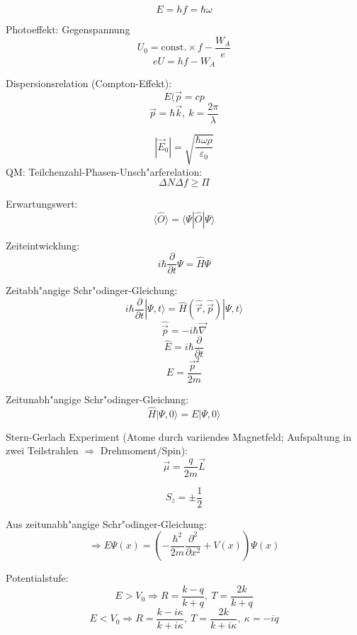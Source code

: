 \documentclass[12pt]{report}
\newcommand{\vabla}{\vec{\nabla}}
\newcommand{\vepsilon}{\varepsilon}
\begin{document}
\[E=hf=\hbar\omega\]

Photoeffekt:
Gegenspannung
\[U_0=\mathrm{const.}\times f-\frac{W_A}{e}\]
\[eU=hf-W_A\]

Dispersionsrelation (Compton-Effekt):
\[E(\vec{p}=cp\]
\[\vec{p}=\hbar\vec{k},\ k=\frac{2\pi}{\lambda}\]

\[|\vec{E}_0|=\sqrt{\frac{\hbar\omega\rho}{\vepsilon_0}}\]
QM: Teilchenzahl-Phasen-Unsch"arferelation:
\[\Delta N\Delta f\geq\Pi\]

Erwartungswert:
\[\langle\hat{O}\rangle=\langle\Psi|\hat{O}|\Psi\rangle\]

Zeiteintwicklung:
\[i\hbar\frac{\partial}{\partial t}\Psi=\hat{H}\Psi\]

Zeitabh"angige Schr"odinger-Gleichung:
\[i\hbar\frac{\partial}{\partial t}|\Psi,t\rangle=\hat{H}(\hat{\vec{r}},\hat{\vec{p}})|\Psi,t\rangle\]
\[\hat{\vec{p}}=-i\hbar\vabla\]
\[\hat{E}=i\hbar\frac{\partial}{\partial t}\]
\[E=\frac{\vec{p}^2}{2m}\]

Zeitunabh"angige Schr"odinger-Gleichung:
\[\hat{H}|\Psi,0\rangle=E|\Psi,0\rangle\]

Stern-Gerlach Experiment (Atome durch variiendes Magnetfeld; Aufspaltung in zwei Teilstrahlen $\Rightarrow$ Drehmoment/Spin):
\[\vec{\mu}=\frac{q}{2m}\vec{L}\]

\[S_z=\pm\frac{1}{2}\]

Aus zeitunabh"angige Schr"odinger-Gleichung:
\[\Rightarrow E\Psi(x)=\left(-\frac{\hbar^2}{2m}\frac{\partial^2}{\partial x^2}+V(x)\right)\Psi(x)\]

Potentialstufe:
\[E>V_0\Rightarrow R=\frac{k-q}{k+q},\ T=\frac{2k}{k+q}\]
\[E<V_0\Rightarrow R=\frac{k-i\kappa}{k+i\kappa},\ T=\frac{2k}{k+i\kappa},\ \kappa=-iq\]
\end{document}
